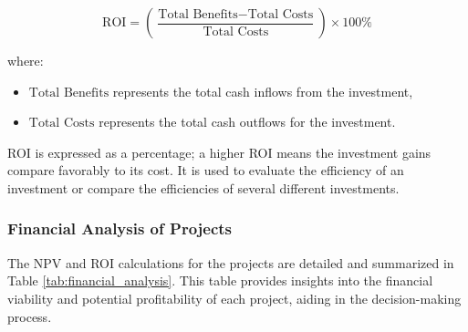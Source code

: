 \[
\text{ROI} = \left(\frac{\text{Total Benefits} - \text{Total Costs}}{\text{Total Costs}}\right) \times 100\%
\]

where:
\begin{itemize}
    \item \(\text{Total Benefits}\) represents the total cash inflows from the investment,
    \item \(\text{Total Costs}\) represents the total cash outflows for the investment.
\end{itemize}

ROI is expressed as a percentage; a higher ROI means the investment gains compare favorably to its cost. It is used to evaluate the efficiency of an investment or compare the efficiencies of several different investments.

\subsubsection*{Financial Analysis of Projects}
The NPV and ROI calculations for the projects are detailed and summarized in Table \ref{tab:financial_analysis}. This table provides insights into the financial viability and potential profitability of each project, aiding in the decision-making process.

